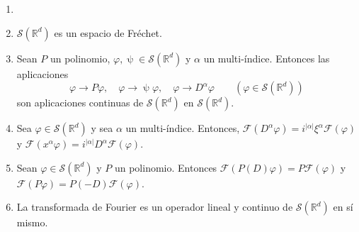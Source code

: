 \begin{teorema}\label{thm:d03}

\begin{enumerate}
\item[]
\item $\mathcal{S}(\mathds{R}^{d})$ es un espacio de Fréchet.
\item Sean $P$ un polinomio, $\varphi,\uppsi\in  \mathcal{S}(\mathds{R}^{d})$ y $\alpha$ un multi-índice. Entonces las aplicaciones 
\begin{equation}
\varphi \rightarrow P\varphi, \quad \varphi \rightarrow \uppsi\varphi, \quad \varphi \rightarrow D^{\alpha}\varphi \qquad (\varphi \in \mathcal{S}(\mathds{R}^{d}))
\end{equation}
son aplicaciones continuas de $\mathcal{S}(\mathds{R}^{d})$ en $\mathcal{S}(\mathds{R}^{d})$.
\item  Sea $\varphi\in\mathcal{S}(\mathds{R}^{d})$ y sea $\alpha$ un multi-índice. Entonces, $\mathcal{F}(D^{\alpha}\varphi) = i^{\vert\alpha\vert } \xi^{\alpha}\mathcal{F}(\varphi)$ y $\mathcal{F}(x^{\alpha}\varphi) =  i^{\vert\alpha\vert }D^{\alpha}\mathcal{F}(\varphi)$.
\item Sean $\varphi\in\mathcal{S}(\mathds{R}^{d})$ y $P$ un polinomio. Entonces $\mathcal{F}(P(D)\varphi) = P \mathcal{F}(\varphi)$ y $\mathcal{F}(P\varphi) = P(-D) \mathcal{F}(\varphi)$.
\item La transformada de Fourier es un operador lineal y continuo de $\mathcal{S}(\mathds{R}^{d})$ en sí mismo.  
\end{enumerate}
\end{teorema}

